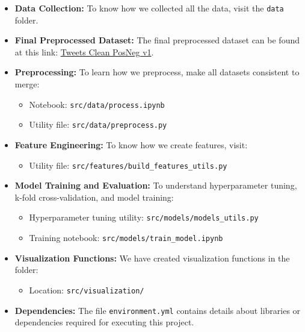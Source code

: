 \begin{itemize}
    \item \textbf{Data Collection:} To know how we collected all the data, visit the \texttt{data} folder.
    \item \textbf{Final Preprocessed Dataset:} The final preprocessed dataset can be found at this link: 
    \href{https://www.kaggle.com/datasets/zphudzz/tweets-clean-posneg-v1}{Tweets Clean PosNeg v1}.
    \item \textbf{Preprocessing:} To learn how we preprocess, make all datasets consistent to merge:
    \begin{itemize}
        \item Notebook: \texttt{src/data/process.ipynb}
        \item Utility file: \texttt{src/data/preprocess.py}
    \end{itemize}
    \item \textbf{Feature Engineering:} To know how we create features, visit:
    \begin{itemize}
        \item Utility file: \texttt{src/features/build\_features\_utils.py}
    \end{itemize}
    \item \textbf{Model Training and Evaluation:} To understand hyperparameter tuning, k-fold cross-validation, and model training:
    \begin{itemize}
        \item Hyperparameter tuning utility: \texttt{src/models/models\_utils.py}
        \item Training notebook: \texttt{src/models/train\_model.ipynb}
    \end{itemize}
    \item \textbf{Visualization Functions:} We have created visualization functions in the folder:
    \begin{itemize}
        \item Location: \texttt{src/visualization/}
    \end{itemize}
    \item \textbf{Dependencies:} The file \texttt{environment.yml} contains details about libraries or dependencies required for executing this project.
\end{itemize}

\newpage
